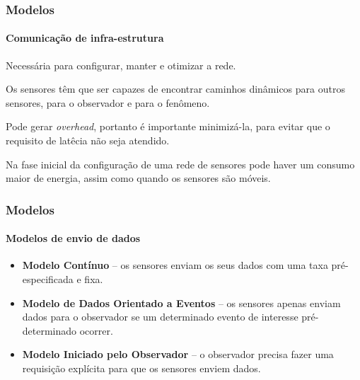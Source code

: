 \documentclass[notes]{beamer}
\begin{document}
\begin{frame}
\label{slide_56}
\frametitle{Modelos}
\framesubtitle{Comunicação de infra-estrutura}

\begin{block}

Necessária para configurar, manter e otimizar a rede.

\end{block} \pause

\begin{block}

Os sensores têm que ser capazes de encontrar caminhos dinâmicos para outros sensores, para o observador e para o fenômeno.

\end{block} \pause

\begin{block}

Pode gerar \textit{overhead}, portanto é importante minimizá-la, para evitar que o requisito de latêcia não seja atendido. 

\end{block} \pause

\begin{block}

Na fase inicial da configuração de uma rede de sensores pode haver um consumo maior de energia, assim como quando os sensores são móveis. 

\end{block}

\end{frame}

\begin{frame}
\label{slide_57}
\frametitle{Modelos}
\framesubtitle{Modelos de envio de dados}

\begin{block}

\begin{itemize}

\item \textbf{Modelo Contínuo} – os sensores enviam os seus dados com uma taxa pré-especificada e fixa. \pause
\item \textbf{Modelo de Dados Orientado a Eventos} – os sensores apenas enviam dados para o observador se um determinado evento de interesse pré-determinado ocorrer. \pause
\item \textbf{Modelo Iniciado pelo Observador} – o observador precisa fazer uma requisição explícita para que os sensores enviem dados. 

\end{itemize}
\end{block}

\end{frame}
\end{document}
